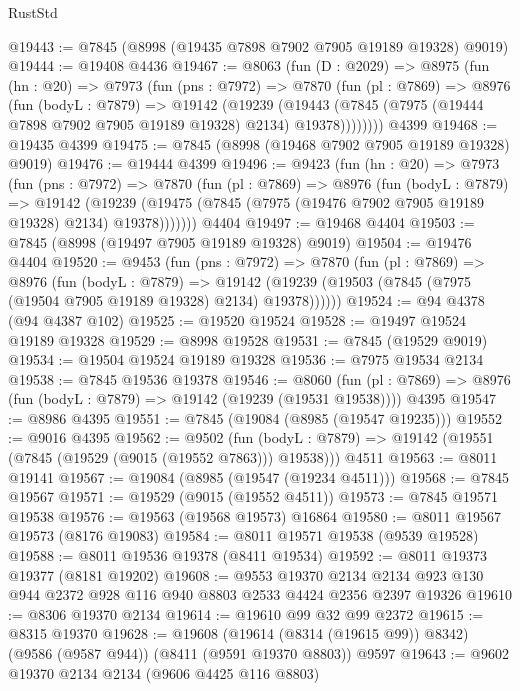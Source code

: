 \begin{lexlean}{RustStd}
\begin{coremodule}
@19443 := @7845 (@8998 (@19435 @7898 @7902 @7905 @19189 @19328) @9019)
@19444 := @19408 @4436
@19467 := @8063
    (fun (D : @2029) =>
    @8975
      (fun (hn : @20) =>
      @7973
        (fun (pns : @7972) =>
        @7870
          (fun (pl : @7869) =>
          @8976
            (fun (bodyL : @7879) =>
            @19142
              (@19239
                (@19443 (@7845 (@7975 (@19444 @7898 @7902 @7905 @19189 @19328) @2134) @19378))))))))
    @4399
@19468 := @19435 @4399
@19475 := @7845 (@8998 (@19468 @7902 @7905 @19189 @19328) @9019)
@19476 := @19444 @4399
@19496 := @9423
    (fun (hn : @20) =>
    @7973
      (fun (pns : @7972) =>
      @7870
        (fun (pl : @7869) =>
        @8976
          (fun (bodyL : @7879) =>
          @19142
            (@19239 (@19475 (@7845 (@7975 (@19476 @7902 @7905 @19189 @19328) @2134) @19378)))))))
    @4404
@19497 := @19468 @4404
@19503 := @7845 (@8998 (@19497 @7905 @19189 @19328) @9019)
@19504 := @19476 @4404
@19520 := @9453
    (fun (pns : @7972) =>
    @7870
      (fun (pl : @7869) =>
      @8976
        (fun (bodyL : @7879) =>
        @19142 (@19239 (@19503 (@7845 (@7975 (@19504 @7905 @19189 @19328) @2134) @19378))))))
@19524 := @94 @4378 (@94 @4387 @102)
@19525 := @19520 @19524
@19528 := @19497 @19524 @19189 @19328
@19529 := @8998 @19528
@19531 := @7845 (@19529 @9019)
@19534 := @19504 @19524 @19189 @19328
@19536 := @7975 @19534 @2134
@19538 := @7845 @19536 @19378
@19546 := @8060
    (fun (pl : @7869) => @8976 (fun (bodyL : @7879) => @19142 (@19239 (@19531 @19538))))
    @4395
@19547 := @8986 @4395
@19551 := @7845 (@19084 (@8985 (@19547 @19235)))
@19552 := @9016 @4395
@19562 := @9502
    (fun (bodyL : @7879) => @19142 (@19551 (@7845 (@19529 (@9015 (@19552 @7863))) @19538)))
    @4511
@19563 := @8011 @19141
@19567 := @19084 (@8985 (@19547 (@19234 @4511)))
@19568 := @7845 @19567
@19571 := @19529 (@9015 (@19552 @4511))
@19573 := @7845 @19571 @19538
@19576 := @19563 (@19568 @19573) @16864
@19580 := @8011 @19567 @19573 (@8176 @19083)
@19584 := @8011 @19571 @19538 (@9539 @19528)
@19588 := @8011 @19536 @19378 (@8411 @19534)
@19592 := @8011 @19373 @19377 (@8181 @19202)
@19608 := @9553
    @19370
    @2134
    @2134
    @923
    @130
    @944
    @2372
    @928
    @116
    @940
    @8803
    @2533
    @4424
    @2356
    @2397
    @19326
@19610 := @8306 @19370 @2134
@19614 := @19610 @99 @32 @99 @2372
@19615 := @8315 @19370
@19628 := @19608
    (@19614 (@8314 (@19615 @99)) @8342)
    (@9586 (@9587 @944))
    (@8411 (@9591 @19370 @8803))
    @9597
@19643 := @9602
    @19370
    @2134
    @2134
    (@9606 @4425 @116 @8803)

\end{coremodule}
\end{lexlean}
